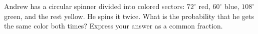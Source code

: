 Andrew has a circular spinner divided into colored sectors: $72^\circ$ red, $60^\circ$ blue, $108^\circ$ green, and the rest yellow. He spins it twice. What is the probability that he gets the same color both times? Express your answer as a common fraction.
